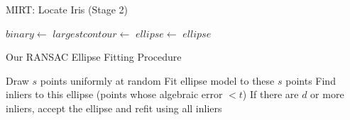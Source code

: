 \begin{algorithm}[h]
\begin{dBox}
	\caption{MIRT: Locate Iris (Stage 2)} \label{mirt_iris_algo}
	\begin{algorithmic}[1]
		\State $binary \gets$ 
		\State {}
		\State {}
		\State $largestcontour \gets$ 
		\State $ellipse \gets$ 
		\State \Return $ellipse$
		\EndProcedure	
	\end{algorithmic}
\end{dBox}	
\end{algorithm}


\begin{algorithm}
\begin{dBox}
	\caption{Our RANSAC Ellipse Fitting Procedure} \label{our_ransac}
	\begin{algorithmic}[1]
			\State Draw $s$ points uniformly at random
			\State Fit ellipse model to these $s$ points
			\State Find inliers to this ellipse (points whose algebraic error $ < t$)
			\State If there are $d$ or more inliers, accept the ellipse and refit using all inliers	
		\EndWhile	
		\EndProcedure	
	\end{algorithmic}
\end{dBox}	
\end{algorithm}
